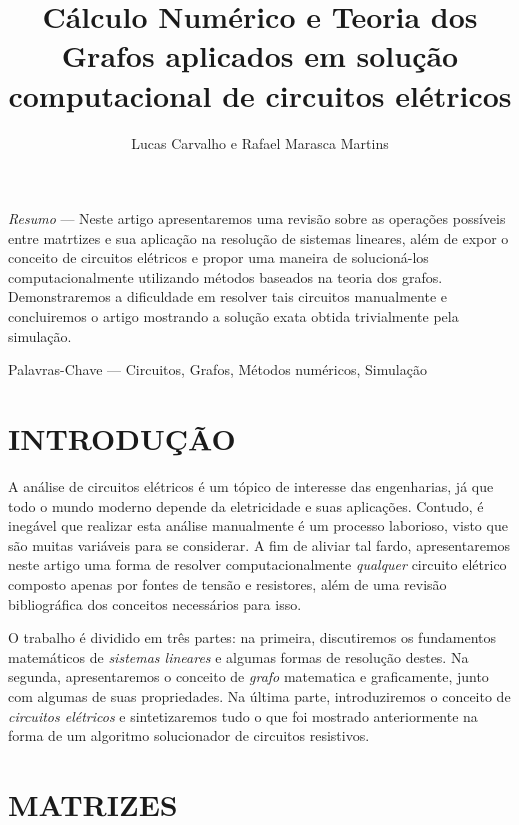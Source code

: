 \documentclass[twocolumn, 10pt]{extarticle}
\begin{document}
\singlespacing

\title{Cálculo Numérico e Teoria dos Grafos aplicados em solução computacional de circuitos elétricos}
\date{}
\author{Lucas Carvalho e Rafael Marasca Martins}

\maketitle

\thispagestyle{empty}

\begin{bfseries}
\small
\textit{Resumo} — Neste artigo apresentaremos uma revisão sobre as operações possíveis entre matrtizes e sua aplicação na resolução de sistemas lineares, além de expor o conceito de circuitos elétricos e propor uma maneira de solucioná-los computacionalmente utilizando métodos baseados na teoria dos grafos. Demonstraremos a dificuldade em resolver tais circuitos manualmente e concluiremos o artigo mostrando a solução exata obtida trivialmente pela simulação.

\bigskip
Palavras-Chave — Circuitos, Grafos, Métodos numéricos, Simulação
\end{bfseries}

\section{INTRODUÇÃO}

A análise de circuitos elétricos é um tópico de interesse das engenharias, já que todo o mundo moderno depende da eletricidade e suas aplicações. Contudo, é inegável que realizar esta análise manualmente é um processo laborioso, visto que são muitas variáveis para se considerar. A fim de aliviar tal fardo, apresentaremos neste artigo uma forma de resolver computacionalmente \textit{qualquer} circuito elétrico composto apenas por fontes de tensão e resistores, além de uma revisão bibliográfica dos conceitos necessários para isso.

O trabalho é dividido em três partes: na primeira, discutiremos os fundamentos matemáticos de \textit{sistemas lineares} e algumas formas de resolução destes. Na segunda, apresentaremos o conceito de \textit{grafo} matematica e graficamente, junto com algumas de suas propriedades. Na última parte, introduziremos o conceito de \textit{circuitos elétricos} e sintetizaremos tudo o que foi mostrado anteriormente na forma de um algoritmo solucionador de circuitos resistivos.


\section{MATRIZES}
\end{document}
